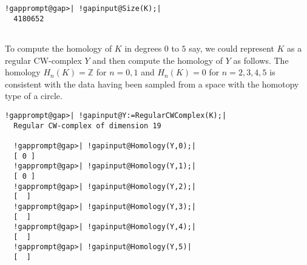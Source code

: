 \documentclass[a4paper,11pt]{report}
\begin{document}
{{\begin{Verbatim}[commandchars=!@|,fontsize=\small,frame=single,label=Example]
  !gapprompt@gap>| !gapinput@Size(K);|
  4180652
  
\end{Verbatim}
 

To compute the homology of $K$ in degrees $0$ to $5$ say, we could represent $K$ as a regular CW-complex $Y$ and then compute the homology of $Y$ as follows. The homology $H_n(K)=\mathbb Z$ for $n=0,1$ and $H_n(K)= 0$ for $n=2,3,4,5$ is consistent with the data having been sampled from a space with the homotopy
type of a circle. 
\begin{Verbatim}[commandchars=!@|,fontsize=\small,frame=single,label=Example]
  !gapprompt@gap>| !gapinput@Y:=RegularCWComplex(K);|
  Regular CW-complex of dimension 19
  
  !gapprompt@gap>| !gapinput@Homology(Y,0);|
  [ 0 ]
  !gapprompt@gap>| !gapinput@Homology(Y,1);|
  [ 0 ]
  !gapprompt@gap>| !gapinput@Homology(Y,2);|
  [  ]
  !gapprompt@gap>| !gapinput@Homology(Y,3);|
  [  ]
  !gapprompt@gap>| !gapinput@Homology(Y,4);|
  [  ]
  !gapprompt@gap>| !gapinput@Homology(Y,5)|
  [  ]
  
\end{Verbatim}
 }

 }

 
\end{document}
